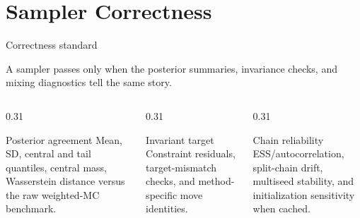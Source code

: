 \documentclass[11pt,aspectratio=169]{beamer}
\newcommand{\claim}[1]{\begin{block}{}\large #1\end{block}}
\begin{document}
\section{Sampler Correctness}

\begin{frame}{Correctness standard}
  \claim{A sampler passes only when the posterior summaries, invariance checks, and mixing diagnostics tell the same story.}
  \vspace{0.3cm}
  \begin{columns}[T,onlytextwidth]
    \begin{column}{0.31\textwidth}
      \begin{block}{Posterior agreement}
        Mean, SD, central and tail quantiles, central mass, Wasserstein distance versus the raw weighted-MC benchmark.
      \end{block}
    \end{column}
    \begin{column}{0.31\textwidth}
      \begin{block}{Invariant target}
        Constraint residuals, target-mismatch checks, and method-specific move identities.
      \end{block}
    \end{column}
    \begin{column}{0.31\textwidth}
      \begin{block}{Chain reliability}
        ESS/autocorrelation, split-chain drift, multiseed stability, and initialization sensitivity when cached.
      \end{block}
    \end{column}
  \end{columns}
\end{frame}
\end{document}
